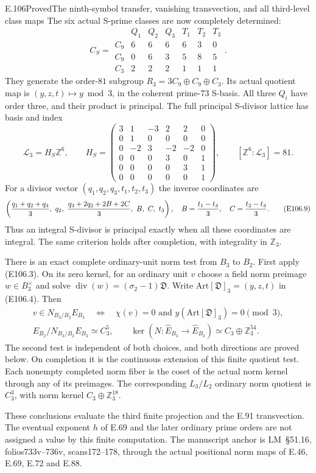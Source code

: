 \begin{statement}{E.106}{Proved}{The ninth-symbol transfer, vanishing transvection, and all third-level class maps}
The six actual S-prime classes are now completely determined:
\[
 C_S=
 \begin{array}{c|rrrrrr}
 &Q_1&Q_2&Q_3&T_1&T_2&T_3\\ \hline
 C_9&6&6&6&6&3&0\\
 C_9&0&6&3&5&8&5\\
 C_3&2&2&2&1&1&1
 \end{array}.
 \tag{E106.7}
\]
They generate the order-$81$ subgroup
$R_3=3C_9\oplus C_9\oplus C_3$. Its actual quotient map is
$(y,z,t)\mapsto y\bmod3$, in the coherent prime-$73$ S-basis.
All three $Q_i$ have order three, and their product is principal.
The full principal S-divisor lattice has basis and index
\[
 \mathcal L_3=H_S\mathbb Z^6,\qquad
 H_S=\begin{pmatrix}
 3&1&-3&2&2&0\\
 0&1&0&0&0&0\\
 0&-2&3&-2&-2&0\\
 0&0&0&3&0&1\\
 0&0&0&0&3&1\\
 0&0&0&0&0&1
 \end{pmatrix},\qquad
 [\mathbb Z^6:\mathcal L_3]=81 .
 \tag{E106.8}
\]
For a divisor vector $(q_1,q_2,q_3,t_1,t_2,t_3)$ the inverse
coordinates are
\[
 \left(
 {q_1+q_2+q_3\over3},\ q_2,\
 {q_3+2q_2+2B+2C\over3},\ B,\ C,\ t_3
 \right),\quad
 B={t_1-t_3\over3},\quad C={t_2-t_3\over3}.
 \tag{E106.9}
\]
Thus an integral S-divisor is principal exactly when all
these coordinates are integral. The same criterion holds
after completion, with integrality in $\mathbb Z_3$.

There is an exact complete ordinary-unit norm test from
$B_3$ to $B_2$. First apply (E106.3). On its zero kernel,
for an ordinary unit $v$ choose a field norm preimage
$w\in B_3^\times$ and solve
$\operatorname{div}(w)=(\sigma_2-1)\mathfrak D$.
Write $\mathrm{Art}[\mathfrak D]_3=(y,z,t)$ in (E106.4).
Then
\[
 \begin{gathered}
 v\in N_{B_3/B_2}E_{B_3}
   \quad\Longleftrightarrow\quad
   \chi(v)=0\text{ and }y(\mathrm{Art}[\mathfrak D]_3)=0\pmod3,\\
 E_{B_2}/N_{B_3/B_2}E_{B_3}\simeq C_3^5,\qquad
 \ker(N:\widehat E_{B_3}\to\widehat E_{B_2})
                     \simeq C_3\oplus\mathbb Z_3^{54}.
 \end{gathered}
 \tag{E106.10}
\]
The second test is independent of both choices, and both
directions are proved below. On completion it is the
continuous extension of this finite quotient test. Each
nonempty completed norm fiber is the coset of the actual
norm kernel through any of its preimages. The corresponding
$L_3/L_2$ ordinary norm quotient is $C_3^3$, with norm kernel
$C_3\oplus\mathbb Z_3^{18}$.

These conclusions evaluate the third finite projection and
the E.91 transvection. The eventual exponent $h$ of E.69
and the later ordinary prime orders are not assigned a
value by this finite computation. The manuscript anchor is
LM~\S51.16, folios733v--736v, scans172--178, through the actual
positional norm maps of E.46, E.69, E.72 and E.88.
\end{statement}

